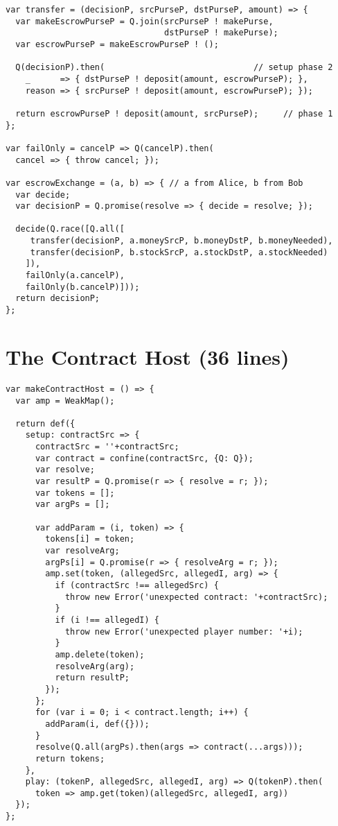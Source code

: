 \documentclass{llncs}
\begin{document}
\begin{verbatim}
var transfer = (decisionP, srcPurseP, dstPurseP, amount) => {
  var makeEscrowPurseP = Q.join(srcPurseP ! makePurse, 
                                dstPurseP ! makePurse);
  var escrowPurseP = makeEscrowPurseP ! ();

  Q(decisionP).then(                              // setup phase 2
    _      => { dstPurseP ! deposit(amount, escrowPurseP); },
    reason => { srcPurseP ! deposit(amount, escrowPurseP); });

  return escrowPurseP ! deposit(amount, srcPurseP);     // phase 1
};

var failOnly = cancelP => Q(cancelP).then(
  cancel => { throw cancel; });

var escrowExchange = (a, b) => { // a from Alice, b from Bob
  var decide;
  var decisionP = Q.promise(resolve => { decide = resolve; });

  decide(Q.race([Q.all([
     transfer(decisionP, a.moneySrcP, b.moneyDstP, b.moneyNeeded),
     transfer(decisionP, b.stockSrcP, a.stockDstP, a.stockNeeded)
    ]), 
    failOnly(a.cancelP), 
    failOnly(b.cancelP)]));
  return decisionP;
};
\end{verbatim}

\section{The Contract Host (36 lines)}
\label{makeContractHost}

\begin{verbatim}
var makeContractHost = () => {
  var amp = WeakMap();

  return def({
    setup: contractSrc => {
      contractSrc = ''+contractSrc;
      var contract = confine(contractSrc, {Q: Q});
      var resolve;
      var resultP = Q.promise(r => { resolve = r; });
      var tokens = [];
      var argPs = [];

      var addParam = (i, token) => {
        tokens[i] = token;
        var resolveArg;
        argPs[i] = Q.promise(r => { resolveArg = r; });
        amp.set(token, (allegedSrc, allegedI, arg) => {
          if (contractSrc !== allegedSrc) {
            throw new Error('unexpected contract: '+contractSrc);
          }
          if (i !== allegedI) {
            throw new Error('unexpected player number: '+i);
          }
          amp.delete(token);
          resolveArg(arg);
          return resultP;
        });
      };
      for (var i = 0; i < contract.length; i++) {
        addParam(i, def({}));
      }
      resolve(Q.all(argPs).then(args => contract(...args)));
      return tokens;
    },
    play: (tokenP, allegedSrc, allegedI, arg) => Q(tokenP).then(
      token => amp.get(token)(allegedSrc, allegedI, arg))
  });
};
\end{verbatim}
\end{document}
